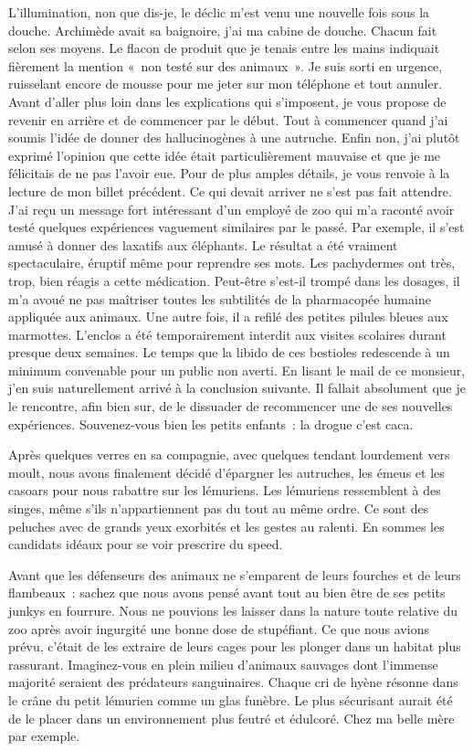 ﻿L’illumination, non que dis-je, le déclic m’est venu une nouvelle fois sous la douche. Archimède avait sa baignoire, j’ai ma cabine de douche. Chacun fait selon ses moyens.
Le flacon de produit que je tenais entre les mains indiquait fièrement la mention « non testé sur des animaux ». Je suis sorti en urgence, ruisselant encore de mousse pour me jeter sur mon téléphone et tout annuler. Avant d’aller plus loin dans les explications qui s’imposent, je vous propose de revenir en arrière et de commencer par le début. 
Tout à commencer quand j’ai soumis l’idée de donner des hallucinogènes à une autruche. Enfin non, j’ai plutôt exprimé l’opinion que cette idée était particulièrement mauvaise et que je me félicitais de ne pas l’avoir eue. Pour de plus amples détails, je vous renvoie à la lecture de mon billet précédent. Ce qui devait arriver ne s’est pas fait attendre. J’ai reçu un message fort intéressant d’un employé de zoo qui m’a raconté avoir testé quelques expériences vaguement similaires par le passé. Par exemple, il s’est amusé à donner des laxatifs aux éléphants. Le résultat a été vraiment spectaculaire, éruptif même pour reprendre ses mots. Les pachydermes ont très, trop, bien réagis a cette médication. Peut-être s’est-il trompé dans les dosages, il m’a avoué ne pas maîtriser toutes les subtilités de la pharmacopée humaine appliquée aux animaux. Une autre fois, il a refilé des petites pilules bleues aux marmottes. L’enclos a été temporairement interdit aux visites scolaires durant presque deux semaines. Le temps que la libido de ces bestioles redescende à un minimum convenable pour un public non averti. 
En lisant le mail de ce monsieur, j’en suis naturellement arrivé à la conclusion suivante. Il fallait absolument que je le rencontre, afin bien sur, de le dissuader de recommencer une de ses nouvelles expériences. Souvenez-vous bien les petits enfants : la drogue c’est caca.

Après quelques verres en sa compagnie, avec quelques tendant lourdement vers moult, nous avons finalement décidé d’épargner les autruches, les émeus et les casoars pour nous rabattre sur les lémuriens.
Les lémuriens ressemblent à des singes, même s’ils n’appartiennent pas du tout au même ordre. Ce sont des peluches avec de grands yeux exorbités et les gestes au ralenti. En sommes les candidats idéaux pour se voir prescrire du speed.

Avant que les défenseurs des animaux ne s’emparent de leurs fourches et de leurs flambeaux : sachez que nous avons pensé avant tout au bien être de ses petits junkys en fourrure. Nous ne pouvions les laisser dans la nature toute relative du zoo après avoir ingurgité une bonne dose de stupéfiant. Ce que nous avions prévu, c’était de les extraire de leurs cages pour les plonger dans un habitat plus rassurant. Imaginez-vous en plein milieu d’animaux sauvages dont l’immense majorité seraient des prédateurs sanguinaires. Chaque cri de hyène résonne dans le crâne du petit lémurien comme un glas funèbre. Le plus sécurisant aurait été de le placer dans un environnement plus feutré et édulcoré. Chez ma belle mère par exemple.

